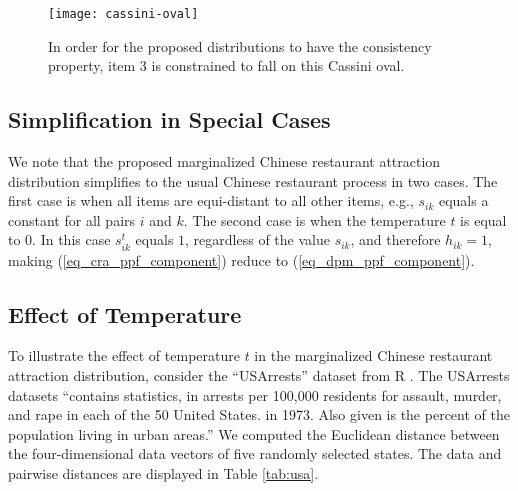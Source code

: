 \documentclass[lineno]{biometrika-dbd}
\begin{document}
\begin{figure}[b]
\centering\texttt{[image: cassini-oval]}
\caption{In order for the proposed distributions to have the consistency
property, item 3 is constrained to fall on this Cassini oval.}
\label{fig_cassini}
\end{figure}

\subsection{Simplification in Special Cases}
\label{sec_special_cases}

We note that the proposed marginalized Chinese restaurant attraction
distribution simplifies to the usual Chinese restaurant process in two cases.
The first case is when all items are equi-distant to all other items, e.g.,
$s_{ik}$ equals a constant for all pairs $i$ and $k$.  The second case is when
the temperature $t$ is equal to 0.  In this case $s_{ik}^t$ equals $1$,
regardless of the value $s_{ik}$, and therefore $h_{ik} = 1$, making
(\ref{eq_cra_ppf_component}) reduce to (\ref{eq_dpm_ppf_component}).

\subsection{Effect of Temperature}
\label{sec_temperature}

To illustrate the effect of temperature $t$ in the marginalized Chinese
restaurant attraction distribution, consider the ``USArrests'' dataset from R
\citep{Rsoftware}.  The USArrests datasets ``contains statistics, in arrests
per 100,000 residents for assault, murder, and rape in each of the 50 United
States.  in 1973.  Also given is the percent of the population living in urban
areas.'' We computed the Euclidean distance between the four-dimensional data
vectors of five randomly selected states.  The data and pairwise distances are
displayed in Table \ref{tab:usa}.
\end{document}
